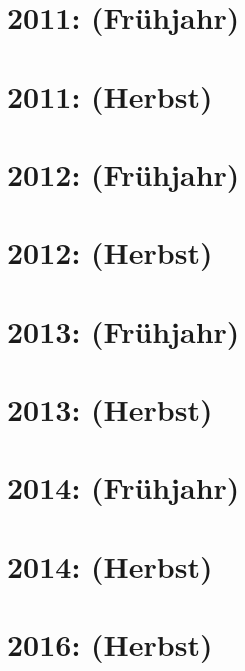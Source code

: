 \documentclass{lehramt-informatik-haupt}
\begin{document}
\section{2011: (Frühjahr)}


\section{2011: (Herbst)}


\section{2012: (Frühjahr)}


\section{2012: (Herbst)}


\section{2013: (Frühjahr)}


\section{2013: (Herbst)}


\section{2014: (Frühjahr)}


\section{2014: (Herbst)}


\section{2016: (Herbst)}

\end{document}
